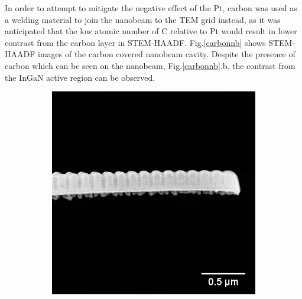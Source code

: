 In order to attempt to mitigate the negative effect of the Pt, carbon was used as a welding material to join the nanobeam to the TEM grid instead, as it was anticipated that the low atomic number of C relative to Pt would result in lower contrast from the carbon layer in STEM-HAADF. Fig.\ref{carbonnb} shows STEM-HAADF images of the carbon covered nanobeam cavity. Despite the presence of carbon which can be seen on the nanobeam, Fig.\ref{carbonnb}.b. the contrast from the InGaN active region can be observed.

\begin{figure}[h]
	\hspace*{2cm}
	\begin{subfigure}[b]{0.35\textwidth}
		\centering
		\includegraphics[width=1\linewidth]{Figs/Ch5/nb2}
		\caption{}
		

\end{subfigure}
\end{figure}
